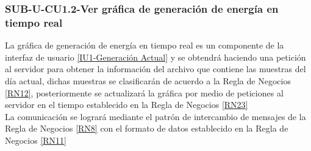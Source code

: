 \subsubsection{SUB-U-CU1.2-Ver gráfica de generación de energía en tiempo real}\label{SUB-U-CU1.2}
La gráfica de generación de energía en tiempo real es un componente de la interfaz de usuario \hyperref[fig:monitoreoReal]{[IU1-Generación Actual]} y se obtendrá haciendo una petición al servidor para obtener la información del archivo que contiene las muestras del día actual, dichas muestras se clasificarán de acuerdo a la Regla de Negocios \ref{RN12}, posteriormente se actualizará la gráfica por medio de peticiones al servidor en el tiempo establecido en la Regla de Negocios \ref{RN23}
\\ 
La comunicación se logrará mediante el patrón de intercambio de mensajes de la Regla de Negocios \ref{RN8} con el formato de datos establecido en la Regla de Negocios \ref{RN11}  

